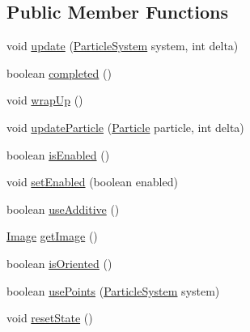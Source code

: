 \subsection*{Public Member Functions}
\begin{DoxyCompactItemize}
\item 
void \mbox{\hyperlink{interfaceorg_1_1newdawn_1_1slick_1_1particles_1_1_particle_emitter_a18e2a8e6264aa46fb874f992c2093e15}{update}} (\mbox{\hyperlink{classorg_1_1newdawn_1_1slick_1_1particles_1_1_particle_system}{Particle\+System}} system, int delta)
\item 
boolean \mbox{\hyperlink{interfaceorg_1_1newdawn_1_1slick_1_1particles_1_1_particle_emitter_a6741f9cbee46594a774b1bfd24a4bf3d}{completed}} ()
\item 
void \mbox{\hyperlink{interfaceorg_1_1newdawn_1_1slick_1_1particles_1_1_particle_emitter_ad8549755b39d63bdde71860be6b0f1f9}{wrap\+Up}} ()
\item 
void \mbox{\hyperlink{interfaceorg_1_1newdawn_1_1slick_1_1particles_1_1_particle_emitter_ac0792f19fdebd62a321bcdc487e0cba5}{update\+Particle}} (\mbox{\hyperlink{classorg_1_1newdawn_1_1slick_1_1particles_1_1_particle}{Particle}} particle, int delta)
\item 
boolean \mbox{\hyperlink{interfaceorg_1_1newdawn_1_1slick_1_1particles_1_1_particle_emitter_a6a6fabad4971a0634a0a99dbed53c47d}{is\+Enabled}} ()
\item 
void \mbox{\hyperlink{interfaceorg_1_1newdawn_1_1slick_1_1particles_1_1_particle_emitter_a0db4bbc7bb9b5cc2b828993e065db057}{set\+Enabled}} (boolean enabled)
\item 
boolean \mbox{\hyperlink{interfaceorg_1_1newdawn_1_1slick_1_1particles_1_1_particle_emitter_a36f6bfeef5567c7c5b42c866a738cdb7}{use\+Additive}} ()
\item 
\mbox{\hyperlink{classorg_1_1newdawn_1_1slick_1_1_image}{Image}} \mbox{\hyperlink{interfaceorg_1_1newdawn_1_1slick_1_1particles_1_1_particle_emitter_a8a4c81c409b505d6708519c492660746}{get\+Image}} ()
\item 
boolean \mbox{\hyperlink{interfaceorg_1_1newdawn_1_1slick_1_1particles_1_1_particle_emitter_a4a51564b4539a1eb2c3fc0d322ac5c2a}{is\+Oriented}} ()
\item 
boolean \mbox{\hyperlink{interfaceorg_1_1newdawn_1_1slick_1_1particles_1_1_particle_emitter_a26ad157d83aebf2e49163ddaae6a9edd}{use\+Points}} (\mbox{\hyperlink{classorg_1_1newdawn_1_1slick_1_1particles_1_1_particle_system}{Particle\+System}} system)
\item 
void \mbox{\hyperlink{interfaceorg_1_1newdawn_1_1slick_1_1particles_1_1_particle_emitter_a1120925a31c61fc95dc38eca9b01b9ef}{reset\+State}} ()
\end{DoxyCompactItemize}


